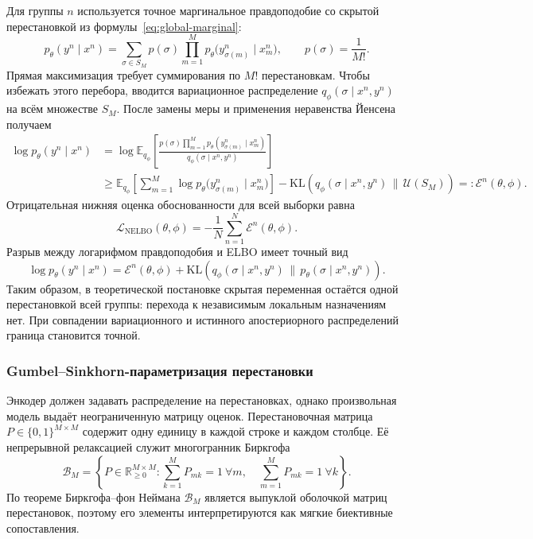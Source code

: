 Для группы $n$ используется точное маргинальное правдоподобие со скрытой перестановкой из
формулы~\eqref{eq:global-marginal}:
\begin{equation}
p_\theta(y^n\mid x^n)
=\sum_{\sigma\in S_M}p(\sigma)
\prod_{m=1}^{M}p_\theta\bigl(y^n_{\sigma(m)}\mid x^n_m\bigr),
\qquad p(\sigma)=\frac{1}{M!}.
\label{eq:neural-exact-marginal}
\end{equation}
Прямая максимизация требует суммирования по $M!$ перестановкам. Чтобы избежать этого
перебора, вводится вариационное распределение
$q_\phi(\sigma\mid x^n,y^n)$ на всём множестве $S_M$. После замены меры и применения
неравенства Йенсена получаем
\begin{align}
\log p_\theta(y^n\mid x^n)
&=\log\mathbb{E}_{q_\phi}
\left[
\frac{p(\sigma)
\prod_{m=1}^{M}p_\theta(y^n_{\sigma(m)}\mid x^n_m)}
{q_\phi(\sigma\mid x^n,y^n)}
\right] \nonumber\\
&\geq
\mathbb{E}_{q_\phi}
\left[\sum_{m=1}^{M}\log p_\theta
\bigl(y^n_{\sigma(m)}\mid x^n_m\bigr)\right]
-\mathrm{KL}\left(
q_\phi(\sigma\mid x^n,y^n)\,\|\,\mathcal{U}(S_M)
\right)
=:\mathcal{E}^n(\theta,\phi).
\label{eq:permutation-elbo}
\end{align}
Отрицательная нижняя оценка обоснованности для всей выборки равна
\begin{equation}
\boxed{
\mathcal{L}_{\mathrm{NELBO}}(\theta,\phi)
=-\frac{1}{N}\sum_{n=1}^{N}\mathcal{E}^n(\theta,\phi).
}
\label{eq:nelbo}
\end{equation}
Разрыв между логарифмом правдоподобия и ELBO имеет точный вид
\begin{equation}
\log p_\theta(y^n\mid x^n)
=\mathcal{E}^n(\theta,\phi)
+\mathrm{KL}\left(
q_\phi(\sigma\mid x^n,y^n)\,\|\,
p_\theta(\sigma\mid x^n,y^n)
\right).
\label{eq:permutation-elbo-gap}
\end{equation}
Таким образом, в теоретической постановке скрытая переменная остаётся одной перестановкой
всей группы: перехода к независимым локальным назначениям нет. При совпадении
вариационного и истинного апостериорного распределений граница становится точной.

\subsubsection{Gumbel--Sinkhorn-параметризация перестановки}
\label{ssec:relax}

Энкодер должен задавать распределение на перестановках, однако произвольная модель выдаёт
неограниченную матрицу оценок. Перестановочная матрица
$P\in\{0,1\}^{M\times M}$ содержит одну единицу в каждой строке и каждом столбце. Её
непрерывной релаксацией служит многогранник Биркгофа
\begin{equation}
\mathcal{B}_M=\left\{
P\in\mathbb{R}_{\geq 0}^{M\times M}:
\sum_{k=1}^{M}P_{mk}=1\ \forall m,\quad
\sum_{m=1}^{M}P_{mk}=1\ \forall k
\right\}.
\label{eq:birkhoff-polytope}
\end{equation}
По теореме Биркгофа--фон Неймана $\mathcal{B}_M$ является выпуклой оболочкой матриц
перестановок, поэтому его элементы интерпретируются как мягкие биективные сопоставления.

